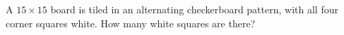 A $15\times15$ board is tiled in an alternating checkerboard pattern, with all four corner squares white. How many white squares are there?
